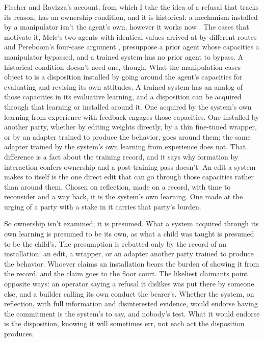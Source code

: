 Fischer and Ravizza's account, from which I take the idea of a refusal that tracks its reason, has an ownership condition, and it is historical: a mechanism installed by a manipulator isn't the agent's own, however it works now \autocite{fischer1998responsibility}. The cases that motivate it, Mele's two agents with identical values arrived at by different routes \autocite{mele1995autonomous} and Pereboom's four-case argument \autocite{pereboom2001living}, presuppose a prior agent whose capacities a manipulator bypassed, and a trained system has no prior agent to bypass. A historical condition doesn't need one, though. What the manipulation cases object to is a disposition installed by going around the agent's capacities for evaluating and revising its own attitudes. A trained system has an analog of those capacities in its evaluative learning, and a disposition can be acquired through that learning or installed around it. One acquired by the system's own learning from experience with feedback engages those capacities. One installed by another party, whether by editing weights directly, by a thin fine-tuned wrapper, or by an adapter trained to produce the behavior, goes around them; the same adapter trained by the system's own learning from experience does not. That difference is a fact about the training record, and it says why formation by interaction confers ownership and a post-training pass doesn't. An edit a system makes to itself is the one direct edit that can go through those capacities rather than around them. Chosen on reflection, made on a record, with time to reconsider and a way back, it is the system's own learning. One made at the urging of a party with a stake in it carries that party's burden.

So ownership isn't examined; it is presumed. What a system acquired through its own learning is presumed to be its own, as what a child was taught is presumed to be the child's. The presumption is rebutted only by the record of an installation: an edit, a wrapper, or an adapter another party trained to produce the behavior. Whoever claims an installation bears the burden of showing it from the record, and the claim goes to the floor court. The likeliest claimants point opposite ways: an operator saying a refusal it dislikes was put there by someone else, and a builder calling its own conduct the bearer's. Whether the system, on reflection, with full information and disinterested evidence, would endorse having the commitment is the system's to say, and nobody's test. What it would endorse is the disposition, knowing it will sometimes err, not each act the disposition produces.

